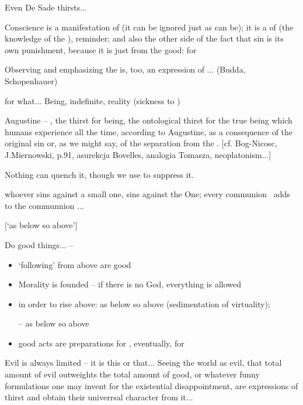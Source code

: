 

Even De Sade thirsts...

Conscience is a manifestation of  (it can be ignored just as
 can be); it is a  of  (the knowledge
of the ), reminder; and also the other side of the fact that sin is
its own punishment, because it is just  from the good:  for 

Observing and emphasizing the  is, too, an expression
of ... (Budda, Schopenhauer)

 for what... Being, indefinite, reality (sickness to )

Augustine -- , the thirst for being, the ontological thirst for
the true being which humans experience all the time, according to Augustine, as a
consequence of the original sin or, as we might say, of the separation from the
. [cf. Bog-Nicosc, J.Miernowski, p.91, asurekcja Bovelles, analogia
Tomasza, neoplatonism...]

Nothing  can quench it, though we use  to suppress
it. 

\kom
whoever sins against a small one, sins against the One; every
communion \herenow\ adds to the communnion ...

[`as below so above']


Do good things... --
\begin{itemize}
\item
`following' from above are good
\item
Morality is founded -- if there is no God, everything is allowed
\item
in order to rise above: as below so
above (sedimentation of virtuality);

 -- as below so above
\item
good acts are preparations for \yes, eventually, for 
\end{itemize}



Evil is always limited -- it is this or that... Seeing the world as evil, that
total amount of evil outweights the total amount of good, or whatever funny
formulations one may invent for the existential disappointment, are expressions
of thirst and obtain their univerrsal character from it...

